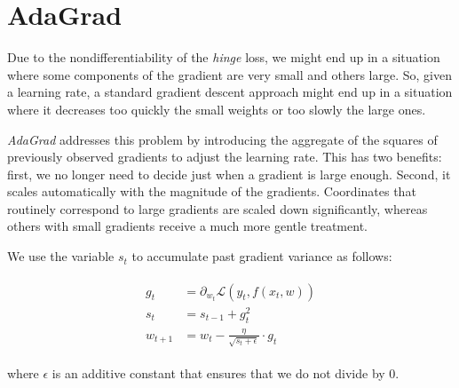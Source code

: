 \section{AdaGrad}

Due to the nondifferentiability of the \emph{hinge} loss, we might end up in a situation where some components of the gradient are very small and others large. So, given a learning rate, a standard gradient descent approach might end up in a situation where it decreases too quickly the small weights or too slowly the large ones.

\emph{AdaGrad} \cite{duchi2011adaptive} addresses this problem by introducing the aggregate of the squares of previously observed gradients to adjust the learning rate. This has two benefits: first, we no longer need to decide just when a gradient is large enough. Second, it scales automatically with the magnitude of the gradients. Coordinates that routinely correspond to large gradients are scaled down significantly, whereas others with small gradients receive a much more gentle treatment.

We use the variable $s_t$ to accumulate past gradient variance as follows:
	
\begin{equation}
	\begin{split}
    \begin{aligned}
        g_t & = \partial_{{w_t}} \mathcal{L}(y_t, f(x_t, w)) \\
        s_t & = s_{t-1} + g_t^2 \\
        w_{t+1} & = w_t - \frac{\eta}{\sqrt{s_t + \epsilon}} \cdot g_t
    \end{aligned}
\end{split}
\end{equation}

where $\epsilon$ is an additive constant that ensures that we do not divide by 0. 
